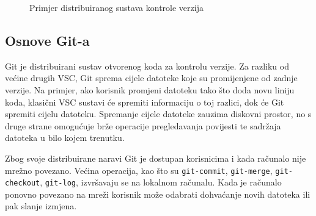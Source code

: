 \begin{figure}[h]

    \caption{Primjer distribuiranog sustava kontrole verzija}%
    \label{fig:02DVCS}
\end{figure}

\subsection{Osnove Git-a}
Git je distribuirani sustav otvorenog koda za kontrolu verzije. Za razliku od većine drugih VSC,
Git sprema cijele datoteke koje su promijenjene od zadnje verzije. Na primjer, ako korisnik promjeni
datoteku tako što doda novu liniju koda, klasični VSC sustavi će spremiti informaciju o toj razlici,
dok će Git spremiti cijelu datoteku. Spremanje cijele datoteke zauzima diskovni prostor, no
s druge strane omogućuje brže operacije pregledavanja povijesti te sadržaja datoteka u bilo kojem
trenutku.

Zbog svoje distribuirane naravi Git je dostupan korisnicima i kada računalo nije mrežno povezano.
Većina operacija, kao što su \texttt{git-commit}, \texttt{git-merge}, \texttt{git-checkout},
\texttt{git-log}, izvršavaju se na lokalnom računalu. Kada je računalo ponovno povezano na mreži
korisnik može odabrati dohvaćanje novih datoteka ili pak slanje izmjena.

